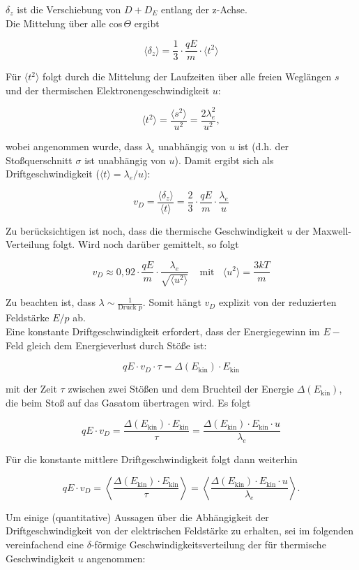 $\delta_z$ ist die Verschiebung von $D+D_E$ entlang der z-Achse.
\\
Die Mittelung über alle cos$\,\Theta$ ergibt

\[ \langle \delta_z \rangle = \frac{1}{3}\cdot \frac{qE}{m}\cdot \langle t^2 \rangle \]

Für $\langle t^2 \rangle$ folgt durch die Mittelung der Laufzeiten über alle freien Weglängen $s$
und der thermischen Elektronengeschwindigkeit $u$:

\[ \langle t^2 \rangle = \frac{\langle s^2 \rangle}{u^2} = \frac{2\lambda_e^2}{u^2} ,\]

wobei angenommen wurde, dass $\lambda_e$ unabhängig von $u$ ist (d.h. der Stoßquerschnitt $\sigma$
ist unabhängig von $u$). Damit ergibt sich als Driftgeschwindigkeit ($\langle t
\rangle=\lambda_e/u$):

\[v_D = \frac{\langle \delta_z \rangle}{\langle t\rangle} = \frac{2}{3}\cdot \frac{qE}{m}\cdot
\frac{\lambda_e}{u}\]

Zu berücksichtigen ist noch, dass die thermische Geschwindigkeit $u$ der Maxwell-Verteilung folgt.
Wird noch darüber gemittelt, so folgt

\[v_D\approx 0{,}92\cdot \frac{qE}{m}\cdot \frac{\lambda_e}{\sqrt{\langle
u^2\rangle}}~~~~~\text{mit}~~~~ \langle u^2\rangle = \frac{3kT}{m}\]

Zu beachten ist, dass $\lambda\sim \frac{1}{\text{Druck }p}$. Somit hängt $v_D$ explizit von der
reduzierten Feldstärke $E/p$ ab.
\\
Eine konstante Driftgeschwindigkeit erfordert, dass der Energiegewinn im $E-$Feld gleich
dem Energieverlust durch Stöße ist:

\[qE\cdot v_D\cdot \tau = \Delta(E_\text{kin})\cdot E_\text{kin}  \]

mit der Zeit $\tau$ zwischen zwei Stößen und dem Bruchteil der Energie $\Delta(E_\text{kin})$, die
beim Stoß auf das Gasatom übertragen wird. Es folgt

\[qE\cdot v_D = \frac{\Delta(E_\text{kin})\cdot E_\text{kin}}{\tau} =
\frac{\Delta(E_\text{kin})\cdot E_\text{kin}\cdot u}{\lambda_e}  \]

Für die konstante mittlere Driftgeschwindigkeit folgt dann weiterhin

\[qE\cdot v_D = \left\langle \frac{\Delta(E_\text{kin})\cdot E_\text{kin}}{\tau} \right\rangle =
\left\langle \frac{\Delta(E_\text{kin})\cdot E_\text{kin}\cdot u}{\lambda_e}\right\rangle .\]

Um einige (quantitative) Aussagen über die Abhängigkeit der Driftgeschwindigkeit von der
elektrischen Feldstärke zu erhalten, sei im folgenden vereinfachend eine $\delta$-förmige
Geschwindigkeitsverteilung der für thermische Geschwindigkeit $u$ angenommen:

